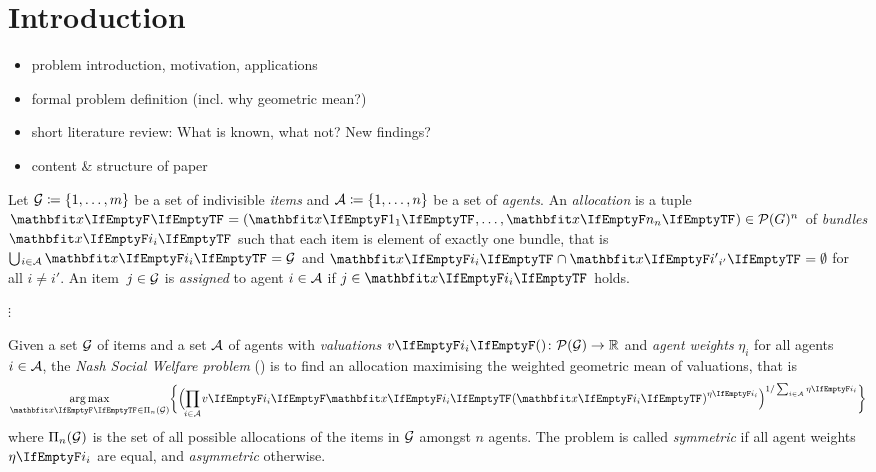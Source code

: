 \section{Introduction}
\label{sec:intro}

\begin{itemize}
	\item
	problem introduction, motivation, applications

	\item
	formal problem definition (incl. why geometric mean?)

	\item
	short literature review: What is known, what not? New findings?

	\item
	content \& structure of paper
\end{itemize}

\begin{definition}
	Let \(\mathcal{G} \coloneq \{1, \dots, m\}\) be a set of indivisible \emph{items} and \(\mathcal{A} \coloneq \{1, \dots, n\}\) be a set of \emph{agents}.
	An \emph{allocation} is a tuple \(\alloc[][] = ( \alloc[][1], \dots, \alloc[][n] ) \in \powerset[G]^n\) of \emph{bundles} \(\alloc\) such that each item is element of exactly one bundle, that is \(\mathop{\bigcup\hspace{-1pt}_{i \in \agents}} \alloc = \goods\) and \(\alloc \cap \alloc[][i'] = \emptyset\) for all \(i \neq i'\).
	An item~\(j \in \mathcal{G}\) is \emph{assigned} to agent \(i \in \mathcal{A}\) if \(j \in \alloc\) holds.
\end{definition}

\(\vdots\)

\begin{definition}
	Given a set \(\mathcal{G}\) of items and a set \(\mathcal{A}\) of agents with \emph{valuations} \(\valuations \colon \powerset[\goods] \to \real\) and \emph{agent weights} \(\eta_i\) for all agents \(i \in \mathcal{A}\), the \emph{Nash Social Welfare problem} (\NSW) is to find an allocation maximising the weighted geometric mean of valuations, that is
	\begin{equation*}
		\argmax_{\alloc[][] \in \allallocs{n}{\goods}} \braces[\bigg]{ \paren[\Big]{ \smashoperator{\prod_{i \in \agents}} \valuations[\alloc]^{\weight} }^{1 / \sum_{i \in \agents} \weight} }
	\end{equation*}
	where \(\Pi_{n}(\mathcal{G})\) is the set of all possible allocations of the items in \(\mathcal{G}\) amongst \(n\) agents.
	The problem is called \emph{symmetric} if all agent weights \(\weight\) are equal, and \emph{asymmetric} otherwise.
\end{definition}

